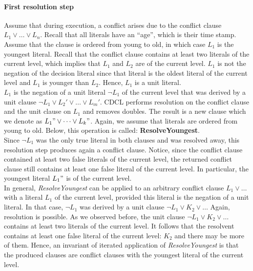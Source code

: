 \documentclass[10pt,a4paper]{article}
\theoremstyle{definition}
\begin{document}
\paragraph{First resolution step} Assume that during execution, a conflict arises due to the conflict clause $L_1 \lor \dots \lor L_n$. Recall that all literals have an “age”, which is their time stamp. Assume that the clause is ordered from young to old, in which case $L_1$ is the youngest literal. Recall that the conflict clause contains at least two literals of the current level, which implies that $L_1$ and $L_2$ are of the current level. $L_1$ is not the negation of the decision literal since that literal is the oldest literal of the current level and $L_1$ is younger than $L_2$. Hence, $L_1$ is a unit literal. \\

$L_1$ is the negation of a unit literal $\lnot L_1$ of the current level that was derived by a unit clause $\lnot L_1 \lor L_2' \lor \dots \lor L_m'$. CDCL performs resolution on the conflict clause and the unit clause on $L_1$ and removes doubles. The result is a new clause which we denote as $L_1" \lor \dots \lor L_k"$. Again, we assume that literals are ordered from young to old. Below, this operation is called: \textbf{ResolveYoungest}. \\

Since $\lnot L_1$ was the only true literal in both clauses and was resolved away, this resolution step produces again a conflict clause. Notice, since the conflict clause contained at least two false literals of the current level, the returned conflict clause still contains at least one false literal of the current level. In particular, the youngest literal $L_1"$ is of the current level. \\

In general, \textit{ResolveYoungest} can be applied to an arbitrary conflict clause $L_1 \lor \dots$ with a literal $L_1$ of the current level, provided this literal is the negation of a unit literal. In that case, $\lnot L_1$ was derived by a unit clause $\lnot L_1 \lor K_2 \lor \dots$ Again, resolution is possible. As we observed before, the unit clause $\lnot L_1 \lor K_2 \lor \dots$ contains at least two literals of the current level. It follows that the resolvent contains at least one false literal of the current level: $K_2$ and there may be more of them. Hence, an invariant of iterated application of \textit{ResolveYoungest} is that the produced clauses are conflict clauses with the youngest literal of the current level.\\
\end{document}
